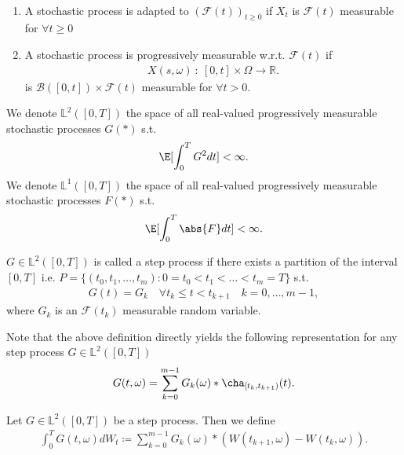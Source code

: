 \begin{definition}
  \hspace{0mm}\\
  \begin{enumerate}
    \item A stochastic process is adapted to $(\mathcal{F}(t))_{t\ge 0}$  if $X_t$ is $\mathcal{F}(t)$ measurable for $\forall  t \ge 0$
    \item A stochastic process is progressively measurable w.r.t. $\mathcal{F}(t)$ if
      \begin{align*}
        X(s,\omega ) \ : \ [0,t] \times  \Omega  \to  \mathbb{R}
      .\end{align*}
      is $\mathcal{B}([0,t]) \times  \mathcal{F}(t)$ measurable for $\forall  t > 0$.
  \end{enumerate}
\end{definition}
\begin{definition}
  We denote $\mathbb{L}^2([0,T])$  the space of all real-valued progressively measurable stochastic processes $G(*)$ s.t.
  \begin{align*}
    \E[\int_0^{T} G^2 dt ] < \infty
  .\end{align*}
  We denote $\mathbb{L}^{1}([0,T]) $ the space of all real-valued progressively measurable stochastic processes $F(*)$ s.t.
  \begin{align*}
    \E[\int_0^{T} \abs{F} dt ] < \infty
  .\end{align*}
\end{definition}
\begin{definition}
  $G \in  \mathbb{L}^2([0,T])$  is called a step process if there exists a partition of the interval $[0,T]$ i.e.
  $P = \{(t_0,t_1,\ldots,t_m):0 = t_{0} < t_{1} < \ldots <t_m =T\}$ s.t. 
  \begin{align*}
    G(t) = G_k \quad \forall  t_k \le t < t_{k+1} \quad k=0,\ldots ,m-1,
  \end{align*}
  where $G_k$ is an $\mathcal{F}(t_k)$ measurable random variable.
\end{definition}
\begin{remark}
Note that the above definition directly yields the following representation for any step process $G \in  \mathbb{L}^2([0,T])$ 
\begin{align*}
  G(t,\omega ) = \sum_{k=0}^{m-1} G_k(\omega )*\cha_{[t_k,t_{k+1})}(t)
.\end{align*}
\end{remark}
\begin{definition}
  Let $G \in  \mathbb{L}^2([0,T])$  be a step process. Then we define 
  \begin{align*}
    \int_0^{T} G(t,\omega ) dW_t \coloneqq \sum_{k=0}^{m-1} G_k(\omega )*(W(t_{k+1},\omega )-W(t_k,\omega ))
  .\end{align*}
\end{definition}
